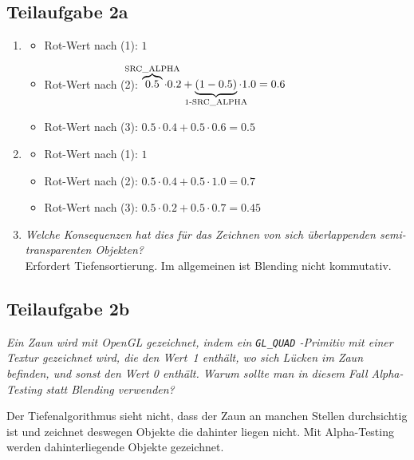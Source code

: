 \documentclass[a4paper]{scrartcl}
\begin{document}
\subsection*{Teilaufgabe 2a}
\begin{enumerate}[label=(\Roman*)]
    \item
    \begin{itemize}
        \item Rot-Wert nach (1): $1$
        \item Rot-Wert nach (2): $\overbrace{0.5}^{\mathclap{\text{SRC\_ALPHA}}} \cdot 0.2 + \underbrace{(1-0.5)}_{\mathclap{\text{1-SRC\_ALPHA}}} \cdot 1.0 = 0.6$
        \item Rot-Wert nach (3): $0.5\cdot0.4+0.5\cdot0.6=0.5$
    \end{itemize}
    \item
    \begin{itemize}
        \item Rot-Wert nach (1): $1$
        \item Rot-Wert nach (2): $0.5\cdot0.4+0.5\cdot1.0=0.7$
        \item Rot-Wert nach (3): $0.5\cdot0.2+0.5\cdot0.7=0.45$
    \end{itemize}
    \item \textit{Welche Konsequenzen hat dies für das Zeichnen von sich
                  überlappenden semi-transparenten Objekten?}\\
          Erfordert Tiefensortierung. Im allgemeinen ist Blending nicht
          kommutativ.
\end{enumerate}

\subsection*{Teilaufgabe 2b}
\textit{Ein Zaun wird mit OpenGL gezeichnet, indem ein \texttt{GL\_QUAD}
-Primitiv mit einer Textur gezeichnet wird, die den Wert~1 enthält, wo sich
Lücken im Zaun befinden, und sonst den Wert 0 enthält. Warum sollte man in
diesem Fall Alpha-Testing statt Blending verwenden?}

Der Tiefenalgorithmus sieht nicht, dass der Zaun an manchen Stellen
durchsichtig ist und zeichnet deswegen Objekte die dahinter liegen nicht. Mit
Alpha-Testing werden dahinterliegende Objekte gezeichnet.
\end{document}
